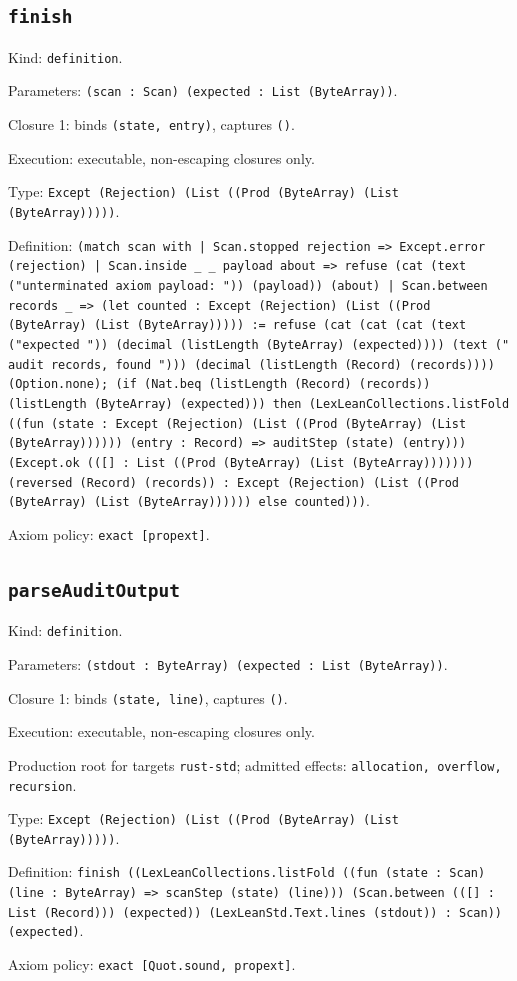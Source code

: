 \documentclass[11pt]{article}
\begin{document}
\subsection*{\texttt{finish}}
\noindent Kind: \texttt{definition}.\par
\noindent Parameters: \texttt{(scan : Scan) (expected : List (ByteArray))}.\par
\noindent Closure 1: binds \texttt{(state, entry)}, captures \texttt{()}.\par
\noindent Execution: executable, non-escaping closures only.\par
\noindent Type: \texttt{Except (Rejection) (List ((Prod (ByteArray) (List (ByteArray)))))}.\par
\noindent Definition: \texttt{(match scan with | Scan.stopped rejection => Except.error (rejection) | Scan.inside \_ \_ payload about => refuse (cat (text ("unterminated axiom payload: ")) (payload)) (about) | Scan.between records \_ => (let counted : Except (Rejection) (List ((Prod (ByteArray) (List (ByteArray))))) := refuse (cat (cat (cat (text ("expected ")) (decimal (listLength (ByteArray) (expected)))) (text (" audit records, found "))) (decimal (listLength (Record) (records)))) (Option.none); (if (Nat.beq (listLength (Record) (records)) (listLength (ByteArray) (expected))) then (LexLeanCollections.listFold ((fun (state : Except (Rejection) (List ((Prod (ByteArray) (List (ByteArray)))))) (entry : Record) => auditStep (state) (entry))) (Except.ok (([] : List ((Prod (ByteArray) (List (ByteArray))))))) (reversed (Record) (records)) : Except (Rejection) (List ((Prod (ByteArray) (List (ByteArray)))))) else counted)))}.\par
\noindent Axiom policy: \texttt{exact [propext]}.\par
\subsection*{\texttt{parseAuditOutput}}
\noindent Kind: \texttt{definition}.\par
\noindent Parameters: \texttt{(stdout : ByteArray) (expected : List (ByteArray))}.\par
\noindent Closure 1: binds \texttt{(state, line)}, captures \texttt{()}.\par
\noindent Execution: executable, non-escaping closures only.\par
\noindent Production root for targets \texttt{rust-std}; admitted effects: \texttt{allocation, overflow, recursion}.\par
\noindent Type: \texttt{Except (Rejection) (List ((Prod (ByteArray) (List (ByteArray)))))}.\par
\noindent Definition: \texttt{finish ((LexLeanCollections.listFold ((fun (state : Scan) (line : ByteArray) => scanStep (state) (line))) (Scan.between (([] : List (Record))) (expected)) (LexLeanStd.Text.lines (stdout)) : Scan)) (expected)}.\par
\noindent Axiom policy: \texttt{exact [Quot.sound, propext]}.\par
\end{document}
